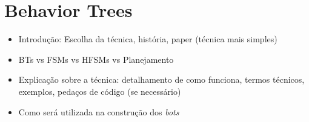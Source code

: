 \chapter{\label{chap:behavior-trees}Behavior Trees}

\begin{mdframed}[backgroundcolor=green!20]
\begin{itemize}
    \item
        Introdução: Escolha da técnica, história, paper (técnica mais simples)
    \item
        BTs vs FSMs vs HFSMs vs Planejamento
    \item
        Explicação sobre a técnica: detalhamento de como funciona, termos
        técnicos, exemplos, pedaços de código (se necessário)
    \item
        Como será utilizada na construção dos \textit{bots}
\end{itemize}
\end{mdframed}
